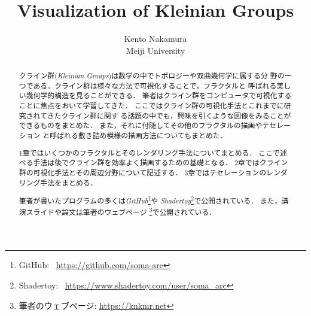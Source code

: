 \documentclass[uplatex, dvipdfmx]{jsarticle}
\title{ Visualization of Kleinian Groups }
\author{ Kento Nakamura\\
Meiji University\\
}
\date{}
\begin{document}
\maketitle

\begin{abstract}
 クライン群(\textit{Kleinian Groups})は数学の中でトポロジーや双曲幾何学に属する分
 野の一つである．クライン群は様々な方法で可視化することで，フラクタルと
 呼ばれる美しい幾何学的構造を見ることができる．
 筆者はクライン群をコンピュータで可視化することに焦点をおいて学習してきた．
 ここではクライン群の可視化手法とこれまでに研究されてきたクライン群に関す
 る話題の中でも，興味を引くような図像をみることができるものをまとめた．
 また，それに付随してその他のフラクタルの描画やテセレーション
 と呼ばれる敷き詰め模様の描画方法についてもまとめた．
 
 1章ではいくつかのフラクタルとそのレンダリング手法についてまとめる．
 ここで述べる手法は後でクライン群を効率よく描画するための基礎となる．
 2章ではクライン群の可視化手法とその周辺分野について記述する．
 3章ではテセレーションのレンダリング手法をまとめる．

 筆者が書いたプログラムの多くは\textit{GitHub}\footnote{GitHub:
 ~\url{https://github.com/soma-arc}}や
 \textit{Shadertoy}\footnote{Shadertoy:
 ~\url{https://www.shadertoy.com/user/soma\_arc}}で公開されている．
 また，講演スライドや論文は筆者のウェブページ
 \footnote{筆者のウェブページ: \url{https://knkmr.net}}で公開されている．

\end{abstract}

\clearpage

\tableofcontents

\clearpage







\printbibliography
\end{document}
